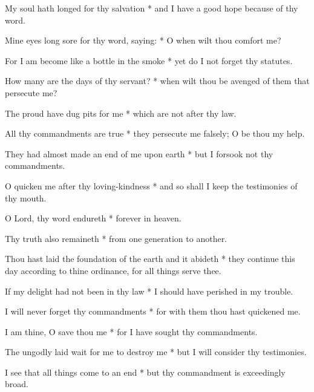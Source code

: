 My soul hath longed for thy salvation * and I have a good hope because of thy word.

Mine eyes long sore for thy word, saying: * O when wilt thou comfort me?

For I am become like a bottle in the smoke * yet do I not forget thy statutes.

How many are the days of thy servant? * when wilt thou be avenged of them that persecute me?

The proud have dug pits for me * which are not after thy law.

All thy commandments are true * they persecute me falsely; O be thou my help.

They had almost made an end of me upon earth * but I forsook not thy commandments.

O quicken me after thy loving-kindness * and so shall I keep the testimonies of thy mouth.

O Lord, thy word endureth * forever in heaven.

Thy truth also remaineth * from one generation to another.

Thou hast laid the foundation of the earth and it abideth * they continue this day according to thine ordinance, for all things serve thee.

If my delight had not been in thy law * I should have perished in my trouble.

I will never forget thy commandments * for with them thou hast quickened me.

I am thine, O save thou me * for I have sought thy commandments.

The ungodly laid wait for me to destroy me * but I will consider thy testimonies.

I see that all things come to an end * but thy commandment is exceedingly broad.